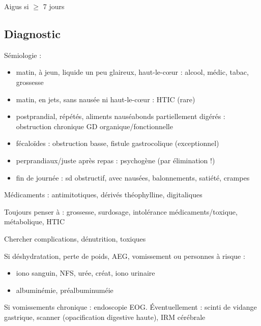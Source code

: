 \documentclass[11pt]{article}
\begin{document}
Aigus si \(\ge\) 7 jours

\subsection{Diagnostic}
\label{sec:org4993d75}
Sémiologie :
\begin{itemize}
\item matin, à jeun, liquide un peu glaireux, haut-le-c\oe{}ur : alcool, médic,
tabac, grossesse
\item matin, en jets, sans nausée ni haut-le-c\oe{}ur : HTIC (rare)
\item postprandial, répétés, aliments nauséabonds partiellement digérés :
obstruction chronique GD organique/fonctionnelle
\item fécaloïdes : obstruction basse, fistule gastrocolique (exceptionnel)
\item perprandiaux/juste après repas : psychogène (par élimination !)
\item fin de journée : sd obstructif, avec nausées, balonnements, satiété, crampes
\end{itemize}

Médicaments : antimitotiques, dérivés théophylline, digitaliques

\begin{tcolorbox}
Toujours penser à : grossesse, surdosage, intolérance médicaments/toxique, métabolique, HTIC
\end{tcolorbox}

Chercher complications, dénutrition, toxiques

Si déshydratation, perte de poids, AEG, vomissement ou personnes à risque :
\begin{itemize}
\item iono sanguin, NFS, urée, créat, iono urinaire
\item albuminémie, préalbuminuméie
\end{itemize}
Si vomissements chronique : endoscopie EOG. Éventuellement : scinti de vidange
gastrique, scanner (opacification digestive haute), IRM cérébrale
\end{document}
